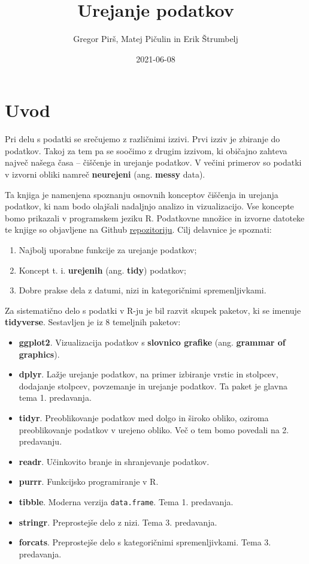 \documentclass[
]{book}
\title{Urejanje podatkov}
\author{Gregor Pirš, Matej Pičulin in Erik Štrumbelj}
\date{2021-06-08}
\providecommand{\tightlist}{%
  \setlength{\itemsep}{0pt}\setlength{\parskip}{0pt}}
\begin{document}
\maketitle

{
\setcounter{tocdepth}{1}
\tableofcontents
}
\hypertarget{uvod}{%
\chapter*{Uvod}\label{uvod}}

Pri delu s podatki se srečujemo z različnimi izzivi. Prvi izziv je zbiranje do podatkov. Takoj za tem pa se soočimo z drugim izzivom, ki običajno zahteva največ našega časa -- čiščenje in urejanje podatkov. V večini primerov so podatki v izvorni obliki namreč \textbf{neurejeni} (ang. \textbf{messy} data).

Ta knjiga je namenjena spoznanju osnovnih konceptov čiščenja in urejanja podatkov, ki nam bodo olajšali nadaljnjo analizo in vizualizacijo. Vse koncepte bomo prikazali v programskem jeziku R. Podatkovne množice in izvorne datoteke te knjige so objavljene na Github \href{https://github.com/bstatcomp/urejanje-podatkov}{repozitoriju}. Cilj delavnice je spoznati:

\begin{enumerate}
\def\labelenumi{\arabic{enumi})}
\tightlist
\item
  Najbolj uporabne funkcije za urejanje podatkov;
\item
  Koncept t. i. \textbf{urejenih} (ang. \textbf{tidy}) podatkov;
\item
  Dobre prakse dela z datumi, nizi in kategoričnimi spremenljivkami.
\end{enumerate}

Za sistematično delo s podatki v R-ju je bil razvit skupek paketov, ki se imenuje \textbf{tidyverse}. Sestavljen je iz 8 temeljnih paketov:

\begin{itemize}
\tightlist
\item
  \textbf{ggplot2}. Vizualizacija podatkov s \textbf{slovnico grafike} (ang. \textbf{grammar of graphics}).
\item
  \textbf{dplyr}. Lažje urejanje podatkov, na primer izbiranje vrstic in stolpcev, dodajanje stolpcev, povzemanje in urejanje podatkov. Ta paket je glavna tema 1. predavanja.
\item
  \textbf{tidyr}. Preoblikovanje podatkov med dolgo in široko obliko, oziroma preoblikovanje podatkov v urejeno obliko. Več o tem bomo povedali na 2. predavanju.
\item
  \textbf{readr}. Učinkovito branje in shranjevanje podatkov.
\item
  \textbf{purrr}. Funkcijsko programiranje v R.
\item
  \textbf{tibble}. Moderna verzija \texttt{data.frame}. Tema 1. predavanja.
\item
  \textbf{stringr}. Preprostejše delo z nizi. Tema 3. predavanja.
\item
  \textbf{forcats}. Preprostejše delo s kategoričnimi spremenljivkami. Tema 3. predavanja.
\end{itemize}
\end{document}
